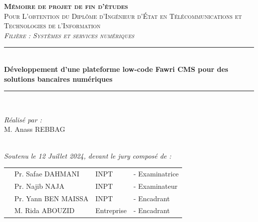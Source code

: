 \vspace{0.9cm}
\begin{center}
    {\large \textsc{\textbf{Mémoire de projet de fin d'études}}}\\[0.1cm]
    {\large \textsc{Pour L'obtention du Diplôme d'Ingénieur d'État en Télécommunications et Technologies de l'Information }}\\[0.1cm]
    {\large \textsc{\textit{Filière : Systèmes et services numériques}}} \\[0.05cm]
    \vspace{-0.04cm}
    \rule{\linewidth}{0.3mm} \\[0.4cm]   %
    { \large \textbf{ Développement d'une plateforme low-code Fawri CMS pour des solutions bancaires numériques }} \\[0.01cm]
    \rule{\linewidth}{0.3mm} \\[0.4cm]
    \vspace{0.4cm}


    \vspace{1cm}

    \noindent
    \begin{minipage}{0.9\textwidth}
        \vspace{-7mm}
        \begin{flushleft} \large
            \emph{Réalisé par :}\\
            M. Anass \textsc{REBBAG} %
        \end{flushleft}
    \end{minipage}
    \begin{minipage}{0.4\textwidth}

    \end{minipage}\\[0.6cm]

    {\large \textit{Soutenu le 12 Juillet 2024, devant le jury composé de : }}\\[0.5cm]


    \begin{tabular}{p{1cm}lll}
         & \large Pr. Safae \textsc{DAHMANI}   & \large INPT       & \large - Examinatrice \\[0.1cm]
         & \large Pr. Najib \textsc{NAJA}      & \large INPT       & \large - Examinateur  \\[0.1cm]
         & \large Pr. Yann \textsc{BEN MAISSA} & \large INPT       & \large - Encadrant    \\[0.1cm]
         & \large M. Rida \textsc{ABOUZID}     & \large Entreprise & \large - Encadrant    \\[0.1cm]
    \end{tabular}


\end{center}
